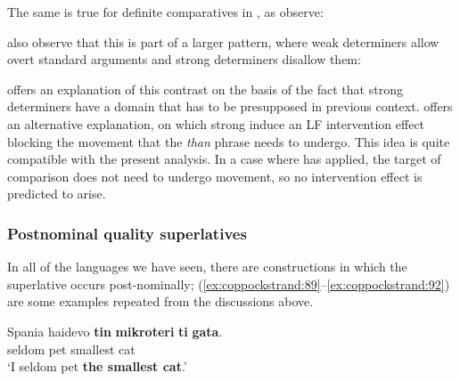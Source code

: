 \documentclass[output=paper
,modfonts
,nonflat]{langsci/langscibook}
\begin{document}
\z

The same is true for definite comparatives in , as \citet{LernerPinkal1995} observe:

\z 

\citet{LernerPinkal1995} also observe that this is part of a larger pattern, where weak determiners allow overt standard arguments and strong determiners disallow them:

\z 

\z 

\citet{Beil1997} offers an explanation of this contrast on the basis of the fact that strong determiners have a domain that has to be presupposed in previous context. \citet{Xiang2005} offers an alternative explanation, on which strong  induce an LF intervention effect blocking the movement that the \textit{than} phrase needs to undergo. This idea is quite compatible with the present analysis. In a case where  has applied, the target of comparison does not need to undergo movement, so no intervention effect is predicted to arise.

\subsubsection{Postnominal quality superlatives}

In all of the languages we have seen, there are constructions in which the superlative occurs post-nominally; (\ref{ex:coppockstrand:89}--\ref{ex:coppockstrand:92}) are some examples repeated from the discussions above.

\ea \label{ex:coppockstrand:89}
\gll Spania haidevo \textbf{tin} \textbf{mikroteri} \textbf{ti} \textbf{gata}.  \\
seldom pet  smallest  cat\\ 
\glt `I seldom pet \textbf{the smallest cat}.'
\z
\end{document}
